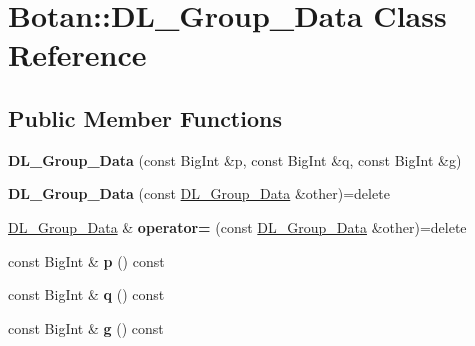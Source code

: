 \hypertarget{class_botan_1_1_d_l___group___data}{}\section{Botan\+:\+:D\+L\+\_\+\+Group\+\_\+\+Data Class Reference}
\label{class_botan_1_1_d_l___group___data}
\subsection*{Public Member Functions}
\begin{DoxyCompactItemize}
\item 
\mbox{\label{class_botan_1_1_d_l___group___data_a6d48d5ba0b2745306025bac0c083f176}} 
{\bfseries D\+L\+\_\+\+Group\+\_\+\+Data} (const Big\+Int \&p, const Big\+Int \&q, const Big\+Int \&g)
\item 
\mbox{\label{class_botan_1_1_d_l___group___data_a6d3a2a59289f13eb4d774b892e666514}} 
{\bfseries D\+L\+\_\+\+Group\+\_\+\+Data} (const \mbox{\hyperlink{class_botan_1_1_d_l___group___data}{D\+L\+\_\+\+Group\+\_\+\+Data}} \&other)=delete
\item 
\mbox{\label{class_botan_1_1_d_l___group___data_a54b3a5cfec4d8546349cc4e8509588b8}} 
\mbox{\hyperlink{class_botan_1_1_d_l___group___data}{D\+L\+\_\+\+Group\+\_\+\+Data}} \& {\bfseries operator=} (const \mbox{\hyperlink{class_botan_1_1_d_l___group___data}{D\+L\+\_\+\+Group\+\_\+\+Data}} \&other)=delete
\item 
\mbox{\label{class_botan_1_1_d_l___group___data_a768df14602f93da911ee2008b972d0c3}} 
const Big\+Int \& {\bfseries p} () const
\item 
\mbox{\label{class_botan_1_1_d_l___group___data_aaf2d26b7b076f8c4e63fb1fc922ffbcd}} 
const Big\+Int \& {\bfseries q} () const
\item 
\mbox{\label{class_botan_1_1_d_l___group___data_a1187d6b1a377e2da9855344c9b63398c}} 
const Big\+Int \& {\bfseries g} () const
\item 

\end{DoxyCompactItemize}
